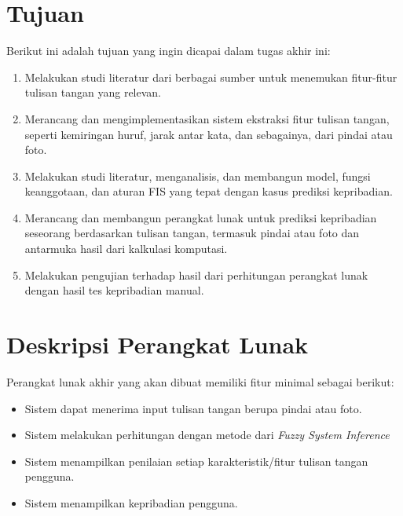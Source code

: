 \documentclass[a4paper,twoside]{article}
\begin{document}
	\section{Tujuan}
	Berikut ini adalah tujuan yang ingin dicapai dalam tugas akhir ini:
	\begin{enumerate}
		\item Melakukan studi literatur dari berbagai sumber untuk menemukan fitur-fitur tulisan tangan yang relevan.
		\item Merancang dan mengimplementasikan sistem ekstraksi fitur tulisan tangan, seperti kemiringan huruf, jarak antar kata, dan sebagainya, dari pindai atau foto.
		\item Melakukan studi literatur, menganalisis, dan membangun model, fungsi keanggotaan, dan aturan FIS yang tepat dengan kasus prediksi kepribadian.
		\item Merancang dan membangun perangkat lunak untuk prediksi kepribadian seseorang berdasarkan tulisan tangan, termasuk pindai atau foto dan antarmuka hasil dari kalkulasi komputasi.
		\item Melakukan pengujian terhadap hasil dari perhitungan perangkat lunak dengan hasil tes kepribadian manual.
	\end{enumerate}

	\section{Deskripsi Perangkat Lunak}
	
	Perangkat lunak akhir yang akan dibuat memiliki fitur minimal sebagai berikut:
	\begin{itemize}
		\item Sistem dapat menerima input tulisan tangan berupa pindai atau foto.
		\item Sistem melakukan perhitungan dengan metode dari \textit{Fuzzy System Inference}
		\item Sistem menampilkan penilaian setiap karakteristik/fitur tulisan tangan pengguna.
		\item Sistem menampilkan kepribadian pengguna.
	\end{itemize}
	
\end{document}
